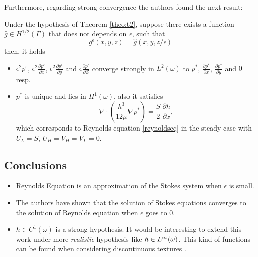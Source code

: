 Furthermore, regarding strong convergence the authors \cite{chambat1986} found the next result:
\begin{theorem}
Under the hypothesis of Theorem \ref{theo:t2}, suppose there exists a function $\hat{g}\in H^{1/2}(\Gamma)$ that does not depends on $\epsilon$, such that
\begin{equation}
g^\epsilon(x,y,z)=\hat{g}(x,y,z/\epsilon)\label{eq:reynolds_limit_cond5.1}
\end{equation}
then, it holds
\begin{itemize}
\item $\epsilon^2p^\epsilon$, $\epsilon^2\frac{\partial p^\epsilon}{\partial x}$, $\epsilon^2\frac{\partial p^\epsilon}{\partial y}$ and $\epsilon \frac{\partial p^\epsilon}{\partial Z}$ converge strongly in $L^2(\omega)$ to $p^*$, $\frac{\partial p^
*}{\partial x}$, $\frac{\partial p^
*}{\partial y}$ and $0$ resp.
\item $p^*$ is unique and lies in $H^1(\omega)$, also it satisfies
$$\nabla\cdot \left(\frac{h^3}{12\mu}\nabla p^*\right)=\frac{S}{2}\,\frac{\partial h}{\partial x},$$
which corresponds to Reynolds equation \eqref*{reynoldseq} in the steady case with $U_L=S$, $U_H=V_H=V_L=0$.
\end{itemize}
\end{theorem}

\subsection*{Conclusions}
\begin{itemize}
\item Reynolds Equation is an approximation of the Stokes system when $\epsilon$ is small.
\item The authors have shown that the solution of Stokes equations converges to the solution of Reynolds equation when $\epsilon$ goes to 0.
\item $h\in C^1(\overline{\omega})$ is a strong hypothesis. It would be interesting to extend this work under more \emph{realistic}  hypothesis like $h\in {L^{\infty}(\omega)}$. This kind of functions can be found when considering discontinuous textures \cite{ausas07,tomanik2013,gherca2014}.
\end{itemize}

